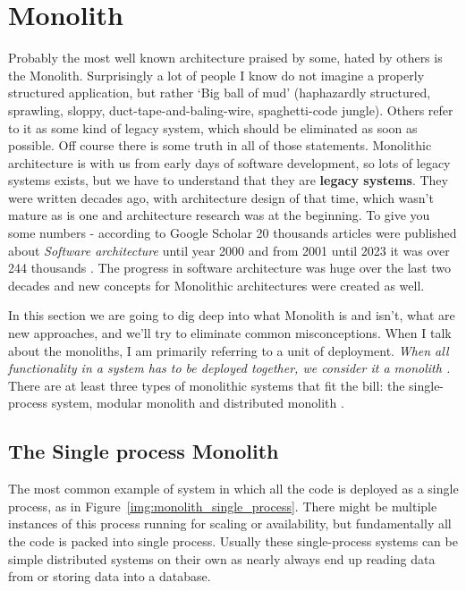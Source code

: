 
\section{Monolith}
Probably the most well known architecture praised by some, hated by others is the Monolith. Surprisingly a lot of people I know do not imagine a properly structured application, but rather `Big ball of mud' \cite{BIG_BALL_OF_MUD} (haphazardly structured, sprawling, sloppy, duct-tape-and-baling-wire, spaghetti-code jungle). Others refer to it as some kind of legacy system, which should be eliminated as soon as possible. Off course there is some truth in all of those statements. Monolithic architecture is with us from early days of software development, so lots of legacy systems exists, but we have to understand that they are \textbf{legacy systems}. They were written decades ago, with architecture design of that time, which wasn't mature as is one and architecture research was at the beginning. To give you some numbers - according to Google Scholar 20 thousands articles were published about \textit{Software architecture} until year 2000 \cite{SCHOLAR_2000} and from 2001 until 2023 it was over 244 thousands \cite{SCHOLAR_2001_2023}. The progress in software architecture was huge over the last two decades and new concepts for Monolithic architectures were created as well.

In this section we are going to dig deep into what Monolith is and isn't, what are new approaches, and we'll try to eliminate common misconceptions. When I talk about the monoliths, I am primarily referring to a unit of deployment\cite{MON_TO_MS_MONOLITH}. \textit{When all functionality in a system has to be deployed together, we consider it a monolith \cite{MON_TO_MS_MONOLITH}.} There are at least three types of monolithic systems that fit the bill: the single-process system, modular monolith and distributed monolith \cite{BUILDING_MS_MONOLITH}.


\subsection{The Single process Monolith}
The most common example of system in which all the code is deployed as a single process, as in Figure~\ref{img:monolith_single_process}. There might be multiple instances of this process running for scaling or availability, but fundamentally all the code is packed into single process. Usually these single-process systems can be simple distributed systems on their own as nearly always end up reading data from or storing data into a database. \cite{MON_TO_MS_MONOLITH}

